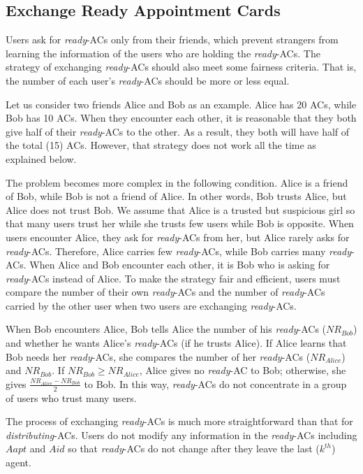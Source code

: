 \documentclass[conference]{IEEEtran}
\begin{document}
\subsection{ Exchange Ready Appointment Cards}

\noindent Users ask for \textit{ready}-ACs only from their friends, which prevent strangers from learning the information of the users who are holding the \textit{ready}-ACs. The strategy of exchanging \textit{ready}-ACs should also meet some fairness criteria. That is, the number of each user's \textit{ready}-ACs should be more or less equal. 

Let us consider two friends Alice and Bob as an example. Alice has 20 ACs, while Bob has 10 ACs. When they encounter each other, it is reasonable that they both give half of their \textit{ready}-ACs to the other. As a result, they both will have half of the total (15) ACs. However, that strategy does not work all the time as explained below.

The problem becomes more complex in the following condition. Alice is a friend of Bob, while Bob is not a friend of Alice. In other words, Bob trusts Alice, but Alice does not trust Bob. We assume that Alice is a trusted but suspicious girl so that many users trust her while she trusts few users while Bob is opposite. When users encounter Alice, they ask for \textit{ready}-ACs from her, but Alice rarely asks for \textit{ready}-ACs. Therefore, Alice carries few \textit{ready}-ACs, while Bob carries many \textit{ready}-ACs. When Alice and Bob encounter each other, it is Bob who is asking for \textit{ready}-ACs instead of Alice. To make the strategy fair and efficient, users must compare the number of their own \textit{ready}-ACs and the number of \textit{ready}-ACs carried by the other user when two users are exchanging \textit{ready}-ACs.

When Bob encounters Alice, Bob tells Alice the number of his \textit{ready}-ACs (${NR}_{Bob}$) and whether he wants Alice's \textit{ready}-ACs (if he trusts Alice). If Alice learns that Bob needs her \textit{ready}-ACs, she compares the number of her \textit{ready}-ACs (${NR}_{Alice}$) and ${NR}_{Bob}$. If ${NR}_{Bob}\ge {NR}_{Alice}$, Alice gives no \textit{ready}-AC to Bob; otherwise, she gives $\frac{{NR}_{Alice}-{NR}_{Bob}}{2}$ to Bob. In this way, \textit{ready}-ACs do not concentrate in a group of users who trust many users. 

The process of exchanging \textit{ready}-ACs is much more straightforward than that for \textit{distributing}-ACs. Users do not modify any information in the \textit{ready}-ACs including $Aapt$ and $Aid$ so that \textit{ready}-ACs do not change after they leave the last ($k^{th}$) agent.
\end{document}
